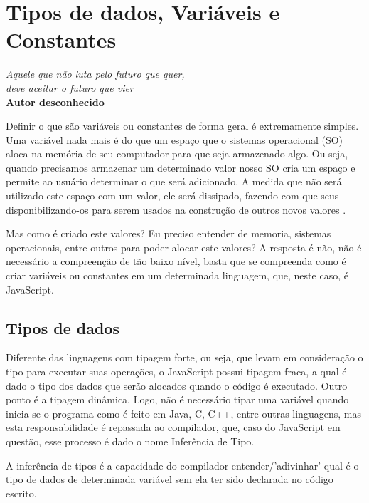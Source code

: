 \chapter{Tipos de dados, Variáveis e Constantes}

\begin{flushright}
  \textit{
    Aquele que não luta pelo futuro que quer, \\
    deve aceitar o futuro que vier
  } \\
  
  \textbf{Autor desconhecido}
\end{flushright}

Definir o que são variáveis ou constantes de forma geral é extremamente 
simples. Uma variável nada mais é do que um espaço que o sistemas operacional 
(SO) aloca na memória de seu computador para que seja armazenado algo. Ou seja, 
quando precisamos armazenar um determinado valor nosso SO cria um espaço e 
permite ao usuário determinar o que será adicionado. A medida que não será 
utilizado este espaço com um valor, ele será dissipado, fazendo com que seus 
disponibilizando-os para serem usados na construção de outros novos valores 
\cite{haverbeke2014eloquent}.

Mas como é criado este valores? Eu preciso entender de memoria, sistemas 
operacionais, entre outros para poder alocar este valores? A resposta é não, 
não é necessário a compreenção de tão baixo nível, basta que se compreenda como é criar variáveis ou constantes em um determinada linguagem, que, neste caso, é JavaScript.

\section{Tipos de dados}

Diferente das linguagens com tipagem forte, ou seja, que levam em consideração o tipo para executar suas operações, o JavaScript possui tipagem fraca, a qual é dado o tipo dos dados que serão alocados quando o código é executado. Outro ponto é a tipagem dinâmica. Logo, não é necessário tipar uma variável quando inicia-se o programa como é feito em Java, C, C++, entre outras linguagens, mas esta responsabilidade é repassada ao compilador, que, caso do JavaScript em questão, esse processo é dado o nome Inferência de Tipo.

A inferência de tipos é a capacidade do compilador entender/’adivinhar’ qual é o tipo de dados de determinada variável sem ela ter sido declarada no código escrito. 

